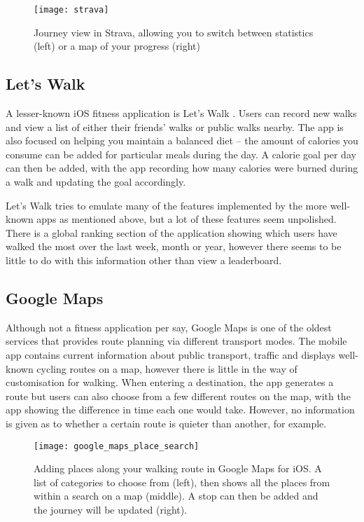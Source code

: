 \begin{figure}[hbt]
  \centering
  \texttt{[image: strava]}
  \caption{Journey view in Strava, allowing you to switch between statistics (left) or a map of your progress (right)}
  \label{fig:strava}
\end{figure}


\subsection{Let's Walk}

A lesser-known iOS fitness application is Let's Walk \cite{LetsWalkApp}. Users can record new walks and view a list of either their friends' walks or public walks nearby. The app is also focused on helping you maintain a balanced diet -- the amount of calories you consume can be added for particular meals during the day. A calorie goal per day can then be added, with the app recording how many calories were burned during a walk and updating the goal accordingly.

Let's Walk tries to emulate many of the features implemented by the more well-known apps as mentioned above, but a lot of these features seem unpolished. There is a global ranking section of the application showing which users have walked the most over the last week, month or year, however there seems to be little to do with this information other than view a leaderboard.



\subsection{Google Maps}

Although not a fitness application per say, Google Maps \cite{GoogleInc.} is one of the oldest services that provides route planning via different transport modes. The mobile app contains current information about public transport, traffic and displays well-known cycling routes on a map, however there is little in the way of customisation for walking. When entering a destination, the app generates a route but users can also choose from a few different routes on the map, with the app showing the difference in time each one would take. However, no information is given as to whether a certain route is quieter than another, for example.

\begin{figure}[hbt]
  \centering
  \texttt{[image: google\_maps\_place\_search]}
  \caption{Adding places along your walking route in Google Maps for iOS. A list of categories to choose from (left), then shows all the places from within a search on a map (middle). A stop can then be added and the journey will be updated (right).}
  \label{fig:google_maps_place_search}
\end{figure}


